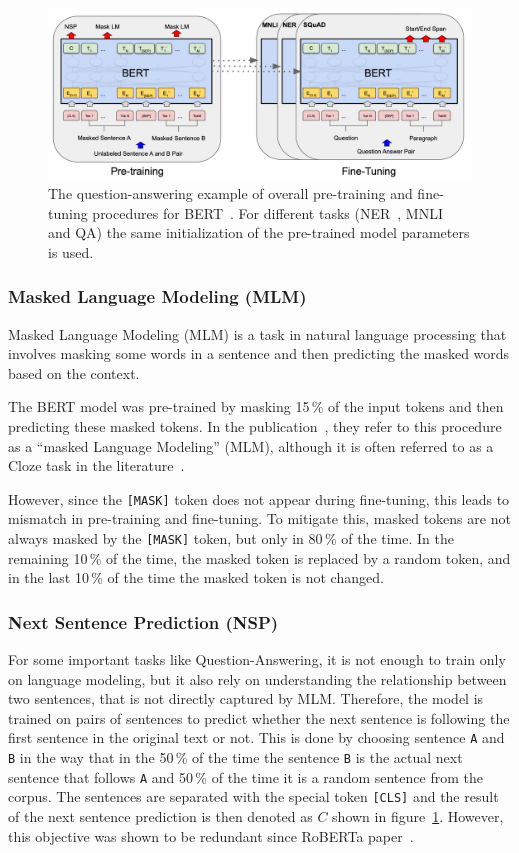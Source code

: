\begin{figure}[h]
    \centering
    \includegraphics[scale=0.15]{figures/bert.png}
    \caption{The question-answering example of overall pre-training and fine-tuning procedures for BERT~\cite{bert}. For different tasks (NER~\cite{ner}, MNLI~\cite{mnli} and QA) the same initialization of the pre-trained model parameters is used.}
    \label{fig:bert}
\end{figure}

\subsubsection*{Masked Language Modeling (MLM)}\label{MLM}
Masked Language Modeling (MLM) is a task in natural language processing that involves masking some words in a sentence and then predicting the masked words based on the context.

The BERT model was pre-trained by masking 15\,\% of the input tokens and then predicting these masked tokens. In the publication~\cite{bert}, they refer to this procedure as a “masked Language Modeling” (MLM), although it is often referred to as a Cloze task in the literature~\cite{cloze}.

However, since the \texttt{[MASK]} token does not appear during fine-tuning, this leads to mismatch in pre-training and fine-tuning. To mitigate this, masked tokens are not always masked by the \texttt{[MASK]} token, but only in 80\,\% of the time. In the remaining 10\,\% of the time, the masked token is replaced by a random token, and in the last 10\,\% of the time the masked token is not changed. 

\subsubsection*{Next Sentence Prediction (NSP)}
For some important tasks like Question-Answering, it is not enough to train only on language modeling, but it also rely on understanding the relationship between two sentences, that is not directly captured by MLM. Therefore, the model is trained on pairs of sentences to predict whether the next sentence is following the first sentence in the original text or not. This is done by choosing sentence \texttt{A} and \texttt{B} in the way that in the 50\,\% of the time the sentence \texttt{B} is the actual next sentence that follows \texttt{A} and 50\,\% of the time it is a random sentence from the corpus. The sentences are separated with the special token \texttt{[CLS]} and the result of the next sentence prediction is then denoted as $C$ shown in figure~\ref{fig:bert}. However, this objective was shown to be redundant since RoBERTa paper~\cite{roberta}.


